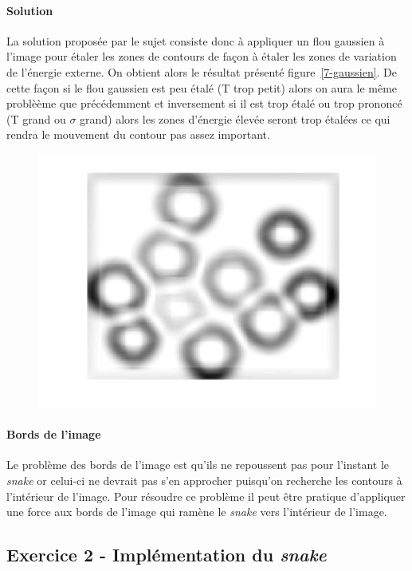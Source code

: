 \documentclass{article}
\begin{document}
\paragraph{Solution}
La solution proposée par le sujet consiste donc à appliquer un flou gaussien à l'image pour étaler les zones de contours de façon à étaler les zones de variation de l'énergie externe. On obtient alors le résultat présenté figure~\ref{7-gaussien}. De cette façon si le flou gaussien est peu étalé (T trop petit) alors on aura le même problèème que précédemment et inversement si il est trop étalé ou trop prononcé (T grand ou $\sigma$ grand) alors les zones d'énergie élevée seront trop étalées ce qui rendra le mouvement du contour pas assez important.

\begin{figure}[!ht]
\includegraphics[width=\textwidth]{images/7-energie_externe.png}
\end{figure}

\paragraph{Bords de l'image}
Le problème des bords de l'image est qu'ils ne repoussent pas pour l'instant le \emph{snake} or celui-ci ne devrait pas s'en approcher puisqu'on recherche les contours à l'intérieur de l'image. Pour résoudre ce problème il peut être pratique d'appliquer une force aux bords de l'image qui ramène le \emph{snake} vers l'intérieur de l'image.

\subsection{Exercice 2 - Implémentation du \emph{snake}}
\end{document}
